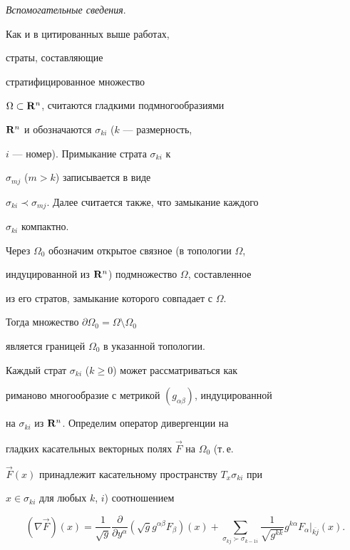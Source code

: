 {\it Вспомогательные сведения}. 


Как и в цитированных выше работах, 


страты, составляющие 


стратифицированное множество 


$\Omega \subset {\bold R}^n$, считаются гладкими подмногообразиями 


${\bold R}^n$ и обозначаются $\sigma_{ki}$ ($k$ --- размерность, 


$i$ --- номер). Примыкание страта $\sigma_{ki}$ к 


$\sigma_{mj}$ ($m>k$) записывается в виде 


$\sigma_{ki}\prec\sigma_{mj}$. Далее считается также, что замыкание каждого 


$\sigma_{ki}$ компактно. 


 


 


Через $\Omega_0$ обозначим открытое связное (в топологии $\Omega$, 


индуцированной из ${\bold R}^n$) подмножество $\Omega$, составленное 


из его стратов, замыкание которого совпадает с $\Omega$. 


Тогда множество $\partial\Omega_0=\Omega\setminus\Omega_0$ 


является границей $\Omega_0$ в указанной топологии. 


 


Каждый страт $\sigma_{ki}$ ($k\geq 0$) может рассматриваться как 


риманово многообразие с метрикой $(g_{\alpha\beta})$, индуцированной 


на $\sigma_{ki}$ из ${\bold R}^n$. Определим оператор дивергенции на 


гладких касательных векторных полях $\Vec F$ на $\Omega_0$ (т.\,е. 


$\Vec F(x)$ принадлежит касательному пространству $T_x\sigma_{ki}$ при 


$x\in\sigma_{ki}$ для любых $k$, $i$) соотношением 


\begin{equation} 


(\nabla\vec F)(x)= 


\frac{1}{\sqrt{g}}\frac{\partial}{\partial y^\alpha} 


(\sqrt{g}g^{\alpha\beta}F_\beta)(x)+ 


\sum_{\sigma_{kj}\succ\sigma_{k-1i}} 


\frac{1}{\sqrt{g^{kk}}} 


g^{k\alpha}F_\alpha\Big|_{\overline{kj}}(x). 


\end{equation} 


